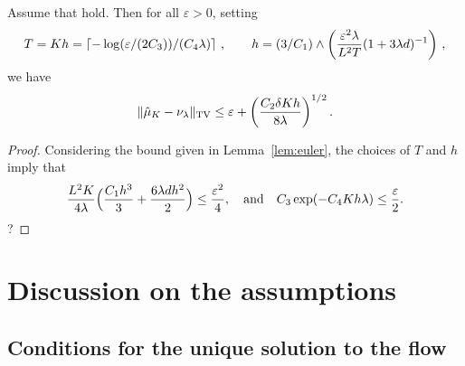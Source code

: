 \begin{cor}
  \label{coro:precision}
  Assume that  hold. Then for all $\varepsilon >0$, setting
  \begin{align}
T = Kh  = \left\lceil -\log(\varepsilon/(2C_3))/(C_4\lambda) \right\rceil \, , \qquad 
h = (3/C_1)\wedge\left(\frac{\varepsilon^2 \lambda}{L^2 T}(1+3\lambda d)^{-1}\right) \,,
  \end{align}
  we have
  \begin{align}
    \| \hat{\mu}_{K} - \nu_\lambda \|_{\textnormal{TV}} \leq \varepsilon + \left(\frac{C_2 \delta K h}{8\lambda}\right)^{1/2} . 
  \end{align}
\end{cor}
\begin{proof}
Considering the bound given in Lemma~\ref{lem:euler}, the choices of $T$ and $h$ imply that
\begin{align}
\frac{L^2 K}{4\lambda} \Bigl( \frac{C_1 h^3}{3} + \frac{6 \lambda d h^2}{2} \Bigr) \leq \frac{\varepsilon^2}{4}, \quad \text{and} \quad C_3 \exp(-C_4 Kh \lambda) \leq \frac{\varepsilon}{2}.
\end{align}
?

\end{proof}

\section{Discussion on the assumptions}


\subsection{Conditions for the unique solution to the flow}

